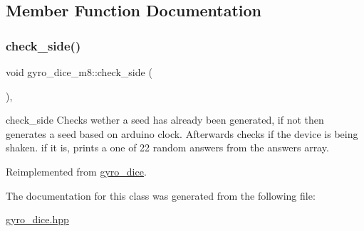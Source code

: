 \subsection{Member Function Documentation}
\mbox{\label{classgyro__dice__m8_a1d81aad976c42ef5ac4f8867b0881ad4}} 
\subsubsection{\texorpdfstring{check\+\_\+side()}{check\_side()}}
{\footnotesize\ttfamily void gyro\+\_\+dice\+\_\+m8\+::check\+\_\+side (\begin{DoxyParamCaption}{ }\end{DoxyParamCaption})\hspace{0.3cm}{\ttfamily [inline]}, {\ttfamily [virtual]}}

check\+\_\+side Checks wether a seed has already been generated, if not then generates a seed based on arduino clock. Afterwards checks if the device is being shaken. if it is, prints a one of 22 random answers from the answers array.

Reimplemented from \hyperlink{classgyro__dice}{gyro\+\_\+dice}.



The documentation for this class was generated from the following file\+:\begin{DoxyCompactItemize}
\item 
\hyperlink{gyro__dice_8hpp}{gyro\+\_\+dice.\+hpp}\end{DoxyCompactItemize}
